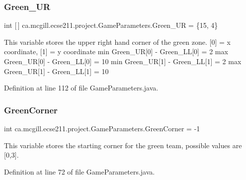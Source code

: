 \subsubsection{\texorpdfstring{Green\+\_\+\+UR}{Green\_UR}}
{\footnotesize\ttfamily int \mbox{[}$\,$\mbox{]} ca.\+mcgill.\+ecse211.\+project.\+Game\+Parameters.\+Green\+\_\+\+UR = \{15, 4\}\hspace{0.3cm}{\ttfamily [static]}}

This variable stores the upper right hand corner of the green zone. \mbox{[}0\mbox{]} = x coordinate, \mbox{[}1\mbox{]} = y coordinate min Green\+\_\+\+UR\mbox{[}0\mbox{]} -\/ Green\+\_\+\+LL\mbox{[}0\mbox{]} = 2 max Green\+\_\+\+UR\mbox{[}0\mbox{]} -\/ Green\+\_\+\+LL\mbox{[}0\mbox{]} = 10 min Green\+\_\+\+UR\mbox{[}1\mbox{]} -\/ Green\+\_\+\+LL\mbox{[}1\mbox{]} = 2 max Green\+\_\+\+UR\mbox{[}1\mbox{]} -\/ Green\+\_\+\+LL\mbox{[}1\mbox{]} = 10 

Definition at line 112 of file Game\+Parameters.\+java.

\mbox{\label{classca_1_1mcgill_1_1ecse211_1_1project_1_1_game_parameters_a7fe7f10f96800fbd5f2331e3aa608b66}} 
\subsubsection{\texorpdfstring{Green\+Corner}{GreenCorner}}
{\footnotesize\ttfamily int ca.\+mcgill.\+ecse211.\+project.\+Game\+Parameters.\+Green\+Corner = -\/1\hspace{0.3cm}{\ttfamily [static]}}

This variable stores the starting corner for the green team, possible values are \mbox{[}0,3\mbox{]}. 

Definition at line 72 of file Game\+Parameters.\+java.

\mbox{\label{classca_1_1mcgill_1_1ecse211_1_1project_1_1_game_parameters_aca550f5067892ceeb8f44ede61bbc90e}} 
